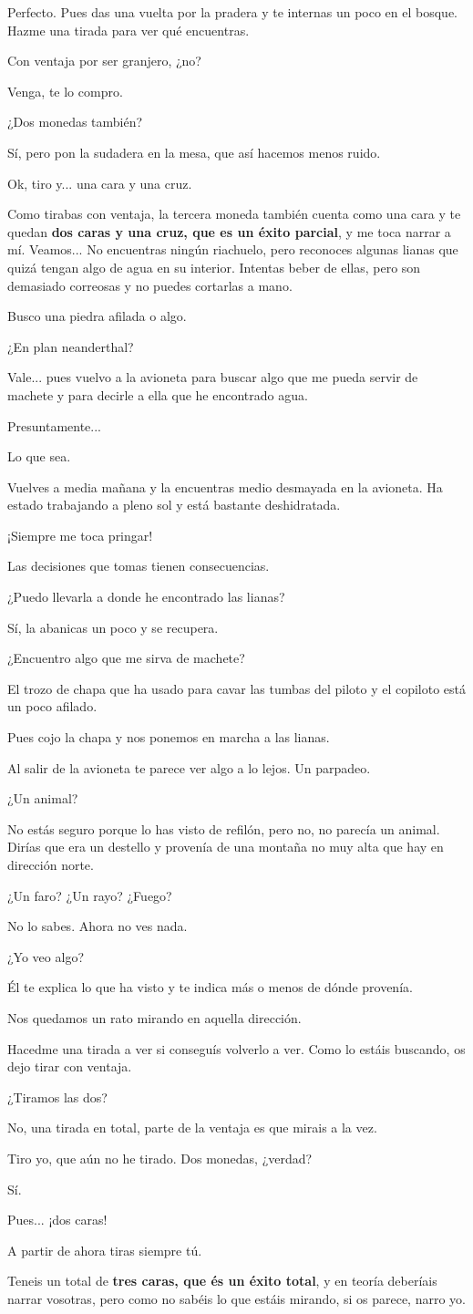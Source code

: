 \documentclass[10pt, a5paper, twocolumn]{article}
\newenvironment{dialogue}
    {\begin{description}[leftmargin=!,align=right,labelwidth=0.cm]}
    {\end{description}}
\newcommand\A{\item[\raisebox{-0.25em}{\scalebox{0.75}{\bctetraedre}}]}
\newcommand\B{\item[\raisebox{-0.25em}{\scalebox{0.75}{\bccube}}]}
\newcommand\E{\item[\raisebox{-0.25em}{\scalebox{0.75}{\bcicosaedre}}]}
\begin{document}
\begin{dialogue}
        \E Perfecto. Pues das una vuelta por la pradera y te internas un poco en el bosque. Hazme una tirada para ver qué encuentras.
        \B Con ventaja por ser granjero, ¿no?
        \E Venga, te lo compro.
        \B ¿Dos monedas también?
        \E Sí, pero pon la sudadera en la mesa, que así hacemos menos ruido.
        \B Ok, tiro y... una cara y una cruz.
        \E Como tirabas con ventaja, la tercera moneda también cuenta como una cara y te quedan \textbf{dos caras y una cruz, que es un éxito parcial}, y me toca narrar a mí. Veamos... No encuentras ningún riachuelo, pero reconoces algunas lianas que quizá tengan algo de agua en su interior. Intentas beber de ellas, pero son demasiado correosas y no puedes cortarlas a mano.
        \B Busco una piedra afilada o algo.
        \E ¿En plan neanderthal?
        \B Vale... pues vuelvo a la avioneta para buscar algo que me pueda servir de machete y para decirle a ella que he encontrado agua.
        \E Presuntamente...
        \B Lo que sea.
        \E Vuelves a media mañana y la encuentras medio desmayada en la avioneta. Ha estado trabajando a pleno sol y está bastante deshidratada.
        \A ¡Siempre me toca pringar!
        \E Las decisiones que tomas tienen consecuencias.
        \B ¿Puedo llevarla a donde he encontrado las lianas?
        \E Sí, la abanicas un poco y se recupera.
        \B ¿Encuentro algo que me sirva de machete?
        \E El trozo de chapa que ha usado para cavar las tumbas del piloto y el copiloto está un poco afilado.
        \B Pues cojo la chapa y nos ponemos en marcha a las lianas.
        \E Al salir de la avioneta te parece ver algo a lo lejos. Un parpadeo.
        \B ¿Un animal?
        \E No estás seguro porque lo has visto de refilón, pero no, no parecía un animal. Dirías que era un destello y provenía de una montaña no muy alta que hay en dirección norte.
        \B ¿Un faro? ¿Un rayo? ¿Fuego?
        \E No lo sabes. Ahora no ves nada.
        \A ¿Yo veo algo?
        \E Él te explica lo que ha visto y te indica más o menos de dónde provenía.
        \B Nos quedamos un rato mirando en aquella dirección.
        \E Hacedme una tirada a ver si conseguís volverlo a ver. Como lo estáis buscando, os dejo tirar con ventaja.
        \B ¿Tiramos las dos?
        \E No, una tirada en total, parte de la ventaja es que mirais a la vez.
        \A Tiro yo, que aún no he tirado. Dos monedas, ¿verdad?
        \E Sí.
        \A Pues... ¡dos caras!
        \B A partir de ahora tiras siempre tú.
        \E Teneis un total de \textbf{tres caras, que és un éxito total}, y en teoría deberíais narrar vosotras, pero como no sabéis lo que estáis mirando, si os parece, narro yo.

\end{dialogue}
\end{document}
